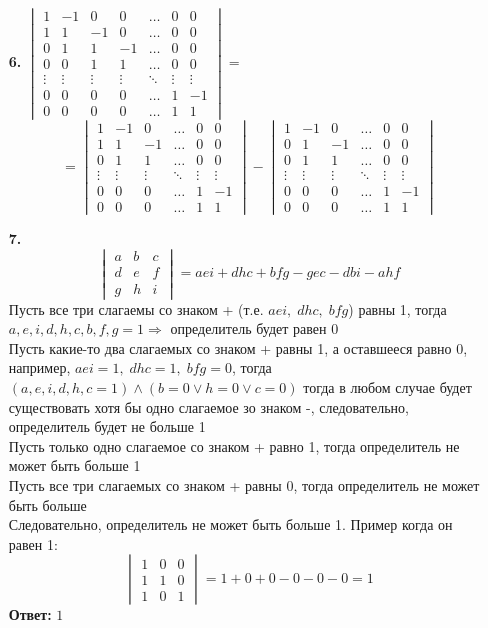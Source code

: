 \documentclass[a4paper]{article}
\renewcommand{\det}[1]{\begin{vmatrix} #1 \end{vmatrix}}
\renewcommand{\r}{\Rightarrow}
\begin{document}
\begin{enumerate}
    \item[\textbf{6.}]
    $\det{1 & -1 & 0 & 0 & \dots & 0 & 0\\
    1 & 1 & -1 & 0 & \dots & 0& 0 \\
    0 & 1 & 1 & -1 & \dots & 0& 0 \\
    0 & 0 & 1 & 1 & \dots & 0 & 0\\
    \vdots & \vdots & \vdots & \vdots & \ddots & \vdots & \vdots \\
    0 & 0 & 0 & 0 & \dots & 1 & -1 \\
    0 & 0 & 0 & 0 & \dots & 1 & 1} =$ 
    $$=\det{
     1 & -1 & 0 & \dots & 0 & 0\\
     1 & 1 & -1 & \dots & 0 & 0\\
     0 & 1 & 1 & \dots & 0 & 0\\
     \vdots & \vdots & \vdots & \ddots & \vdots & \vdots \\
     0 & 0 & 0 & \dots & 1 & -1 \\
     0 & 0 & 0 & \dots & 1 & 1} - 
     \det{
     1 & -1 & 0 & \dots & 0 & 0\\
     0 & 1 & -1 & \dots & 0 & 0\\
     0 & 1 & 1 & \dots & 0& 0 \\
     \vdots &  \vdots & \vdots & \ddots & \vdots& \vdots  \\
     0 & 0 & 0 & \dots & 1 & -1 \\
     0 & 0 & 0 & \dots & 1 & 1}$$
    
    \item[\textbf{7.}]
    $$\det{a & b & c \\ d & e & f \\ g & h & i} = aei +dhc+bfg-gec-dbi-ahf $$
    Пусть все три слагаемы со знаком + (т.е. $aei, \; dhc,\; bfg$) равны 1, тогда
    $a, e, i, d, h, c, b, f, g = 1\r $ определитель будет равен 0\\
    Пусть какие-то два слагаемых со знаком + равны 1, а оставшееся равно 0, например, $aei = 1, \; dhc = 1, \; bfg = 0$, тогда 
    $(a, e, i, d, h, c = 1) \wedge (b=0 \vee h=0 \vee c=0)$ тогда в любом случае будет существовать хотя бы одно слагаемое зо знаком -, следовательно, определитель будет не больше 1\\
    Пусть только одно слагаемое со знаком + равно 1, тогда определитель не может быть больше 1\\
    Пусть все три слагаемых со знаком + равны 0, тогда определитель не может быть больше\\
    Следовательно, определитель не может быть больше 1. Пример когда он равен 1:
    $$\det{1 & 0 & 0 \\ 1 & 1 & 0 \\ 1 & 0 & 1} = 1+0+0-0-0-0 = 1$$
    \textbf{Ответ: } $1$


\end{enumerate}
\end{document}
